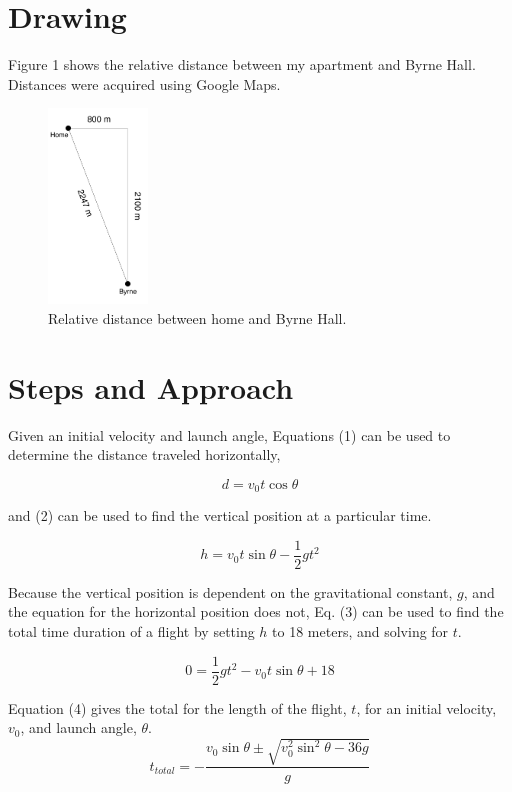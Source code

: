\documentclass[11pt, oneside]{article}   	%
\begin{document}
\vphantom{1}

\section{Drawing}
Figure 1 shows the relative distance between my apartment and Byrne Hall. Distances were acquired using Google Maps.
\begin{figure}
\centering
  \includegraphics[width=100px]{location.jpg}
  \caption{Relative distance between home and Byrne Hall.}
  \label{fig:boat1}
\end{figure}

\section{Steps and Approach}

Given an initial velocity and launch angle, Equations (1) can be used to determine the distance traveled horizontally,

\begin{equation}
d=v_{0}t\cos\theta
\end{equation}

\noindent and (2) can be used to find the vertical position at a particular time.

\begin{equation}
h=v_{0}t\sin\theta - \frac{1}{2}gt^2
\end{equation}

\noindent Because the vertical position is dependent on the gravitational constant, $g$, and the equation for the horizontal position does not, Eq. (3) can be used to find the total time duration of a flight by setting $h$ to 18 meters, and solving for $t$.

\begin{equation}
0=\frac{1}{2}gt^2 - v_{0}t\sin\theta  + 18
\end{equation}

\noindent Equation (4) gives the total for the length of the flight, $t$, for an initial velocity, $v_{0}$, and launch angle, $\theta$.
\begin{equation}
t_{total} = -\frac{v_{0}\sin\theta\pm\sqrt{v_{0}^2\sin^2\theta-36g}}{g}
\end{equation}
\end{document}
